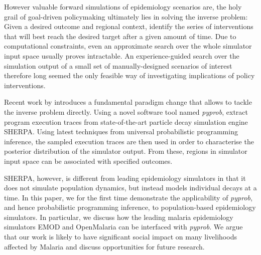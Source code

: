 \documentclass{article}
\begin{document}
However valuable forward simulations of epidemiology scenarios are, the holy grail of goal-driven policymaking ultimately lies in solving the inverse problem: Given a desired outcome and regional context, identify the series of interventions that will best reach the desired target after a given amount of time. Due to computational constraints, even an approximate search over the whole simulator input space usually proves intractable. An experience-guided search over the simulation output of a small set of manually-designed scenarios of interest therefore long seemed the only feasible way of investigating implications of policy interventions.

Recent work by \citep{Baydin} introduces a fundamental paradigm change that allows to tackle the inverse problem directly. Using a novel software tool named \textit{pyprob}, \citep{Baydin} extract program execution traces from state-of-the-art particle decay simulation engine SHERPA\cite{}. Using latest techniques from universal probabilistic programming inference, the sampled execution traces are then used in order to characterise the posterior distribution of the simulator output. From these, regions in simulator input space can be associated with specified outcomes.

SHERPA, however, is different from leading epidemiology simulators in that it does not simulate population dynamics, but instead models individual decays at a time. In this paper, we for the first time demonstrate the applicability of \textit{pyprob}, and hence probabilistic programming inference, to population-based epidemiology simulators. In particular, we discuss how the leading malaria epidemiology simulators EMOD\cite{} and OpenMalaria\cite{} can be interfaced with \textit{pyprob}. We argue that our work is likely to have significant social impact on many livelihoods affected by Malaria and discuss opportunities for future research.





\end{document}
